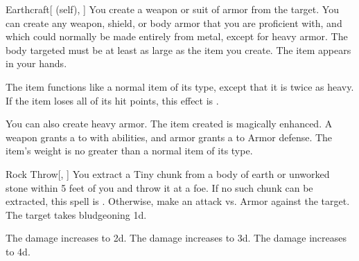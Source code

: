 \lowercase{\hypertarget{spell:Earthcraft}{}}\label{spell:Earthcraft}
\begin{attuneability}[Rank 1]{\hypertarget{spell:Earthcraft}{Earthcraft}}[ (self), ]
You create a weapon or suit of armor from the target.
You can create any weapon, shield, or body armor that you are proficient with, and which could normally be made entirely from metal, except for heavy armor.
The body targeted must be at least as large as the item you create.
The item appears in your hands.

The item functions like a normal item of its type, except that it is twice as heavy.
If the item loses all of its hit points, this effect is .

\rankline
{} You can also create heavy armor.
 The item created is magically enhanced.
A weapon grants a   to  with  abilities,
and armor grants a   to Armor defense.
 The item's weight is no greater than a normal item of its type.

\end{attuneability}
\vspace{0.25em}



\lowercase{\hypertarget{spell:Rock Throw}{}}\label{spell:Rock Throw}
\begin{freeability}[Rank 1]{\hypertarget{spell:Rock Throw}{Rock Throw}}[, ]
You extract a Tiny chunk from a body of earth or unworked stone within 5 feet of you and throw it at a foe.
If no such chunk can be extracted, this spell is .
Otherwise, make an attack vs. Armor against the target.
\hit The target takes bludgeoning  \plus1d.

\rankline
{} The damage increases to  \plus2d.
 The damage increases to  \plus3d.
 The damage increases to  \plus4d.

\end{freeability}
\vspace{0.25em}



